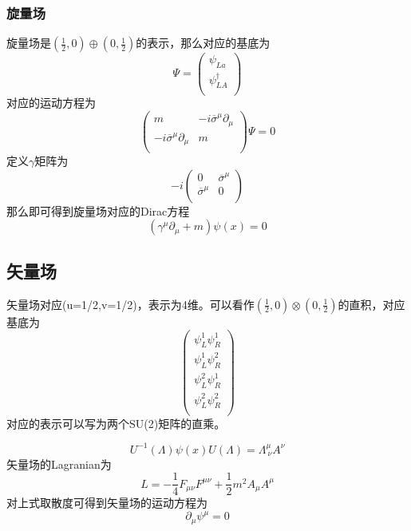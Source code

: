 \documentclass[10pt]{ctexart}
\begin{document}
\subsubsection{旋量场}
旋量场是$(\frac{1}{2},0)\oplus (0,\frac{1}{2})$的表示，那么对应的基底为
\begin{equation}
    \Psi=\left(\begin{array}{c}
        \psi_{La}\\
        \psi^{\dagger}_{LA}\\
    \end{array}\right)
\end{equation}
对应的运动方程为
\begin{equation}
    \left(\begin{array}{cc}
        m&-i\overline{\sigma}^\mu\partial_\mu\\
        -i\overline{\sigma}^\mu\partial_\mu&m\\
    \end{array}\right)\Psi=0
\end{equation}
定义$\gamma$矩阵为
\begin{equation}
    -i\left(\begin{array}{cc}
        0&\overline{\sigma}^\mu\\
        \overline{\sigma}^\mu&0\\
    \end{array}\right)
\end{equation}
那么即可得到旋量场对应的Dirac方程
\begin{equation}
    (\gamma^\mu\partial_\mu+m)\psi(x)=0
\end{equation}
\subsection{矢量场}
矢量场对应(u=1/2,v=1/2)，表示为4维。可以看作$(\frac{1}{2},0)\otimes (0,\frac{1}{2})$的直积，对应基底为
\begin{equation}
    \left(\begin{array}{c}
        \psi^1_{L}\psi^1_R\\
        \psi^1_L\psi^2_R\\
        \psi^2_L\psi^1_R\\
        \psi^2_L\psi^2_R\\
    \end{array}\right)
\end{equation}
对应的表示可以写为两个SU(2)矩阵的直乘。

\begin{equation}
    U^{-1}(\Lambda)\psi(x)U(\Lambda)=\Lambda^{\mu}_{\ \nu} A^\nu
\end{equation}
矢量场的Lagranian为\cite{Lancaster}
\begin{equation}
    L=-\frac{1}{4}F_{\mu\nu}F^{\mu\nu}+\frac{1}{2}m^2A_\mu A^\mu
\end{equation}
对上式取散度可得到矢量场的运动方程为
\begin{equation}
    \partial_\mu\psi^\mu=0
\end{equation}
\end{document}
